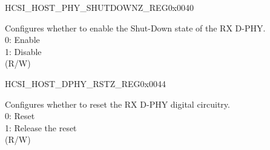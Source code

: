 \begin{register}{H}{CSI\_HOST\_PHY\_SHUTDOWNZ\_REG}{0x0040}\label{regdesc:CSIHOSTPHYSHUTDOWNZREG}
%
%
\regnewline%
\begin{regdesc}\begin{reglist}
\label{fielddesc:CSIHOSTPHYSHUTDOWNZ}\item [CSI\_HOST\_PHY\_SHUTDOWNZ] Configures whether to enable the Shut-Down state of the RX D-PHY.\\ 
0: Enable \\
1: Disable \\
(R/W)
\end{reglist}\end{regdesc}
\end{register}


\begin{register}{H}{CSI\_HOST\_DPHY\_RSTZ\_REG}{0x0044}\label{regdesc:CSIHOSTDPHYRSTZREG}
%
%
\regnewline%
\begin{regdesc}\begin{reglist}
\label{fielddesc:CSIHOSTDPHYRSTZ}\item [CSI\_HOST\_DPHY\_RSTZ] Configures whether to reset the RX D-PHY digital circuitry. \\ 
0: Reset \\
1: Release the reset \\
(R/W)
\end{reglist}\end{regdesc}
\end{register}


